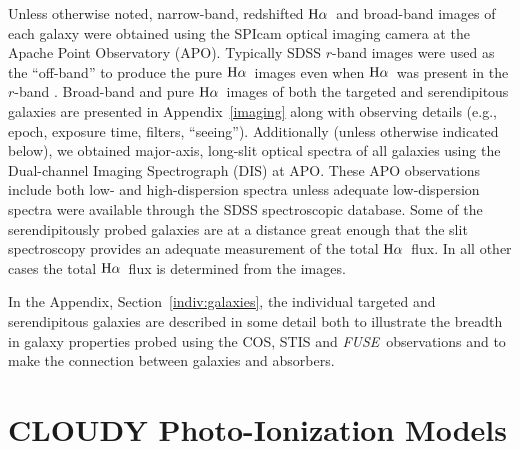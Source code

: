 \documentclass[twocolumn,twocolappendix,tighten,times]{aastex6}
\newcommand{\fuse}{{\sl FUSE}}
\newcommand{\Ha}{\ensuremath{{\rm H}\alpha}}
\begin{document}
Unless otherwise noted, narrow-band, redshifted \Ha\ and broad-band images of 
each galaxy were obtained using the SPIcam optical imaging camera at the Apache 
Point Observatory (APO). Typically SDSS $r$-band images were used as the
``off-band'' to produce the pure \Ha\ images even when \Ha\ was
present in the $r$-band \citep[see][for detailed procedure]{keeney13}. 
Broad-band and pure \Ha\ images of both the
targeted and serendipitous galaxies are presented in Appendix~\ref{imaging}
along with observing details (e.g., epoch, exposure time, filters, 
``seeing''). Additionally (unless otherwise indicated below), we
obtained major-axis, long-slit optical spectra of all galaxies using
the Dual-channel Imaging Spectrograph (DIS) at APO. These APO
observations include both low- and high-dispersion spectra unless
adequate low-dispersion spectra were available through the SDSS
spectroscopic database. Some of the serendipitously probed galaxies
are at a distance great enough that the slit spectroscopy provides an
adequate measurement of the total \Ha\ flux. In all other cases the
total \Ha\ flux is determined from the images.

In the Appendix, Section~\ref{indiv:galaxies}, the individual targeted and
serendipitous galaxies are described in some detail both to illustrate
the breadth in galaxy properties probed using the COS, STIS and \fuse\
observations and to make the connection between galaxies and absorbers.




\section{CLOUDY Photo-Ionization Models}
\label{cloudy}
\end{document}
